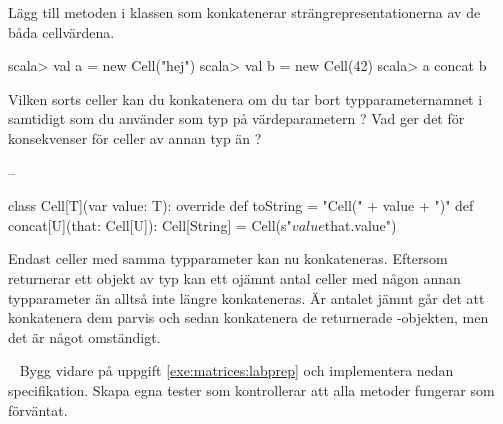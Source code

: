 \Subtask Lägg till metoden  i klassen  som konkatenerar strängrepresentationerna av de båda cellvärdena.

\begin{REPL}
scala> val a = new Cell("hej")
scala> val b = new Cell(42)
scala> a concat b
\end{REPL}

\Subtask Vilken sorts celler kan du konkatenera om du tar bort typparameternamnet  i  samtidigt som du använder  som typ på värdeparametern ? Vad ger det för konsekvenser för celler av annan typ än ?

\SOLUTION

\TaskSolved \what

\SubtaskSolved  --

\SubtaskSolved  \begin{Code}
class Cell[T](var value: T):
  override def toString = "Cell(" + value + ")"
  def concat[U](that: Cell[U]): Cell[String] = 
    Cell(s"$value${that.value}")
\end{Code}

\SubtaskSolved   Endast celler med samma typparameter kan nu konkateneras. Eftersom  returnerar ett objekt av typ  kan ett ojämnt antal celler med någon annan typparameter än  alltså inte längre konkateneras. Är antalet jämnt går det att konkatenera dem parvis och sedan konkatenera de returnerade -objekten, men det är något omständigt.

\QUESTEND


\QUESTBEGIN

\Task \what~ Bygg vidare på uppgift \ref{exe:matrices:labprep} och implementera nedan specifikation. Skapa egna tester som kontrollerar att alla metoder fungerar som förväntat.

